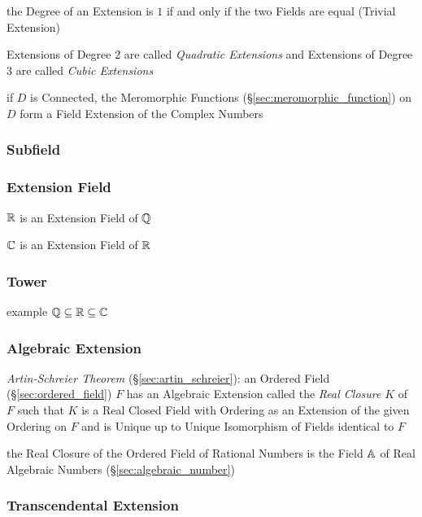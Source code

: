 the Degree of an Extension is $1$ if and only if the two Fields are equal
(Trivial Extension)

Extensions of Degree $2$ are called \emph{Quadratic Extensions} and Extensions
of Degree $3$ are called \emph{Cubic Extensions}

if $D$ is Connected, the Meromorphic Functions
(\S\ref{sec:meromorphic_function}) on $D$ form a Field Extension of the Complex
Numbers



\subsubsection{Subfield}\label{sec:subfield}

\subsubsection{Extension Field}\label{sec:extension_field}

$\mathbb{R}$ is an Extension Field of $\mathbb{Q}$

$\mathbb{C}$ is an Extension Field of $\mathbb{R}$



\subsubsection{Tower}\label{sec:tower}

example $\mathbb{Q} \subseteq \mathbb{R} \subseteq \mathbb{C}$



\subsubsection{Algebraic Extension}\label{sec:algebraic_extension}

\emph{Artin-Schreier Theorem} (\S\ref{sec:artin_schreier}): an Ordered Field
(\S\ref{sec:ordered_field}) $F$ has an Algebraic Extension called the
\emph{Real Closure} $K$ of $F$ such that $K$ is a Real Closed Field with
Ordering as an Extension of the given Ordering on $F$ and is Unique up to
Unique Isomorphism of Fields identical to $F$

the Real Closure of the Ordered Field of Rational Numbers is the Field $\mathbb{A}$
of Real Algebraic Numbers (\S\ref{sec:algebraic_number})



\subsubsection{Transcendental Extension}
\label{sec:transcendental_extension}



